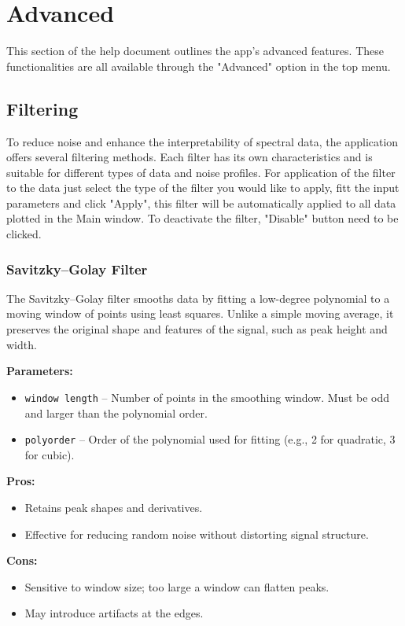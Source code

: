 \chapter{Advanced}
\label{cha:Advanced}
This section of the help document outlines the app's advanced features. These functionalities are all available through the "Advanced" option in the top menu.
\section{Filtering}
To reduce noise and enhance the interpretability of spectral data, the application offers several filtering methods. Each filter has its own characteristics and is suitable for different types of data and noise profiles. For application of the filter to the data just select the type of the filter you would like to apply, fitt the input parameters and click "Apply", this filter will be automatically applied to all data plotted in the Main window. To deactivate the filter, "Disable" button need to be clicked.

\subsection{Savitzky–Golay Filter}

The Savitzky–Golay filter smooths data by fitting a low-degree polynomial to a moving window of points using least squares. Unlike a simple moving average, it preserves the original shape and features of the signal, such as peak height and width.

\textbf{Parameters:}
\begin{itemize}
    \item \texttt{window length} – Number of points in the smoothing window. Must be odd and larger than the polynomial order.
    \item \texttt{polyorder} – Order of the polynomial used for fitting (e.g., 2 for quadratic, 3 for cubic).
\end{itemize}

\textbf{Pros:}
\begin{itemize}
    \item Retains peak shapes and derivatives.
    \item Effective for reducing random noise without distorting signal structure.
\end{itemize}

\textbf{Cons:}
\begin{itemize}
    \item Sensitive to window size; too large a window can flatten peaks.
    \item May introduce artifacts at the edges.
\end{itemize}

